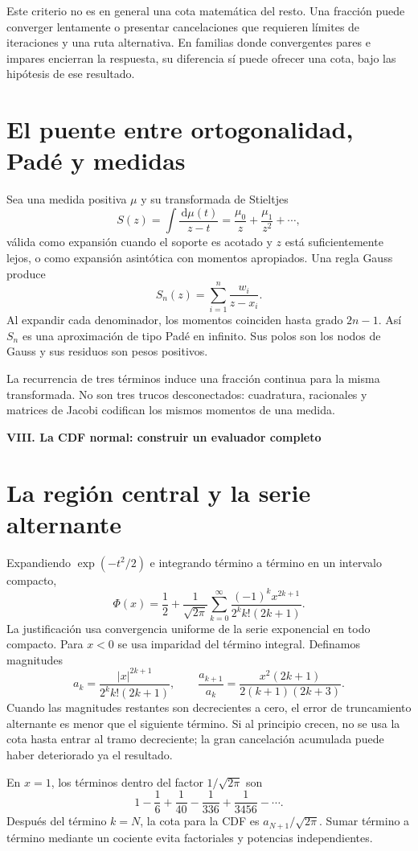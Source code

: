\documentclass[11pt,a4paper]{article}
\newcommand{\dd}{\,\mathrm d}
\theoremstyle{definition}
\newcommand{\parte}[1]{\par\bigskip\Needspace{8\baselineskip}\begin{center}{\Large\bfseries\color{azul}#1}\end{center}}
\begin{document}
Este criterio no es en general una cota matemática del resto. Una fracción puede converger lentamente o presentar cancelaciones que requieren límites de iteraciones y una ruta alternativa. En familias donde convergentes pares e impares encierran la respuesta, su diferencia sí puede ofrecer una cota, bajo las hipótesis de ese resultado.

\section{El puente entre ortogonalidad, Padé y medidas}
Sea una medida positiva $\mu$ y su transformada de Stieltjes
\[
S(z)=\int\frac{\dd\mu(t)}{z-t}
=\frac{\mu_0}z+\frac{\mu_1}{z^2}+\cdots,
\]
válida como expansión cuando el soporte es acotado y $z$ está suficientemente lejos, o como expansión asintótica con momentos apropiados. Una regla Gauss produce
\[
S_n(z)=\sum_{i=1}^n\frac{w_i}{z-x_i}.
\]
Al expandir cada denominador, los momentos coinciden hasta grado $2n-1$. Así $S_n$ es una aproximación de tipo Padé en infinito. Sus polos son los nodos de Gauss y sus residuos son pesos positivos.

La recurrencia de tres términos induce una fracción continua para la misma transformada. No son tres trucos desconectados: cuadratura, racionales y matrices de Jacobi codifican los mismos momentos de una medida.


\parte{VIII. La CDF normal: construir un evaluador completo}
\section{La región central y la serie alternante}
Expandiendo $\exp(-t^2/2)$ e integrando término a término en un intervalo compacto,
\[
\Phi(x)=\frac12+\frac1{\sqrt{2\pi}}
\sum_{k=0}^\infty\frac{(-1)^kx^{2k+1}}{2^kk!(2k+1)}.
\]
La justificación usa convergencia uniforme de la serie exponencial en todo compacto. Para $x<0$ se usa imparidad del término integral. Definamos magnitudes
\[
a_k=\frac{|x|^{2k+1}}{2^kk!(2k+1)},\qquad
\frac{a_{k+1}}{a_k}
=\frac{x^2(2k+1)}{2(k+1)(2k+3)}.
\]
Cuando las magnitudes restantes son decrecientes a cero, el error de truncamiento alternante es menor que el siguiente término. Si al principio crecen, no se usa la cota hasta entrar al tramo decreciente; la gran cancelación acumulada puede haber deteriorado ya el resultado.

En $x=1$, los términos dentro del factor $1/\sqrt{2\pi}$ son
\[
1-\frac16+\frac1{40}-\frac1{336}+\frac1{3456}-\cdots.
\]
Después del término $k=N$, la cota para la CDF es $a_{N+1}/\sqrt{2\pi}$. Sumar término a término mediante un cociente evita factoriales y potencias independientes.
\end{document}
